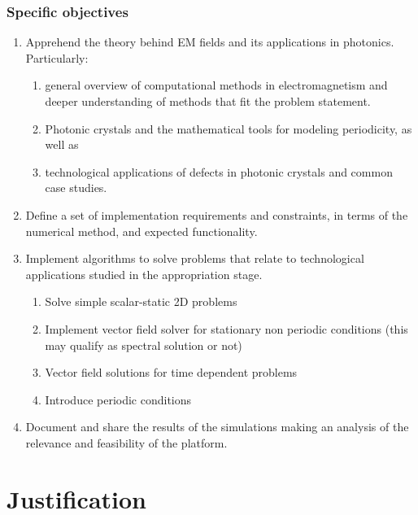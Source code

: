 \subsubsection{Specific objectives}
\begin{enumerate}
\item  Apprehend the theory behind EM fields and its applications in photonics. Particularly: 
\begin{enumerate}
	 \item general overview of computational methods in electromagnetism and deeper understanding of methods that fit the problem statement.
	 \item Photonic crystals and the mathematical tools for modeling periodicity, as well as 
	 \item technological applications of defects in photonic crystals and common case studies. 
\end{enumerate}

\item Define a set of implementation requirements and constraints, in terms of the numerical method, and expected functionality.  

\item Implement algorithms to solve problems that relate to technological applications studied in the appropriation stage. 
	\begin{enumerate}
	\item Solve simple scalar-static 2D problems
	\item Implement vector field solver for stationary non periodic conditions (this may qualify as spectral solution or not)
	\item Vector field solutions for time dependent problems
	\item Introduce periodic conditions
	\end{enumerate}
	
\item Document and share the results of the simulations making an analysis of the relevance and feasibility of the platform. 
\end{enumerate}

\section{Justification}

